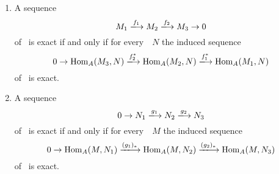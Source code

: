\begin{proposition}
  \leavevmode
  \begin{enumerate}
    \item
      A sequence
      \[
        M_1
        \xlongrightarrow{f_1}
        M_2
        \xlongrightarrow{f_2}
        M_3
        \to 0
      \]
      of~{\Amods} is exact if and only if for every~{\Amod}~$N$ the induced sequence
      \[
        0
        \to
        \Hom_A(M_3, N)
        \xlongrightarrow{f_2^*}
        \Hom_A(M_2, N)
        \xlongrightarrow{f_1^*}
        \Hom_A(M_1, N)
      \]
      of~{\kmods} is exact.
    \item
      \label{left exactness of covariant hom}
      A sequence
      \[
        0
        \to
        N_1
        \xlongrightarrow{g_1}
        N_2
        \xlongrightarrow{g_2}
        N_3
      \]
      of~{\Amods} is exact if and only if for every~{\Amod}~$M$ the induced sequence
      \[
        0
        \to
        \Hom_A(M, N_1)
        \xlongrightarrow{(g_1)_*}
        \Hom_A(M, N_2)
        \xlongrightarrow{(g_2)_*}
        \Hom_A(M, N_3)
      \]
      of~{\kmods} is exact.
  \end{enumerate}
\end{proposition}



